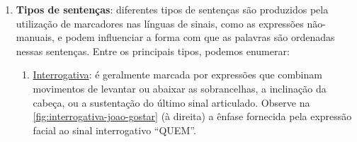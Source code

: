 \begin{enumerate}



    \item \textbf{Tipos de sentenças}: diferentes tipos de sentenças são produzidos pela utilização de marcadores nas línguas de sinais, como as expressões não-manuais, e podem influenciar a forma com que as palavras são ordenadas nessas sentenças.
          Entre os principais tipos, podemos enumerar:



          \begin{enumerate}
              \item \underline{Interrogativa}: é geralmente marcada por expressões que combinam movimentos de levantar ou abaixar as sobrancelhas, a inclinação da cabeça, ou a sustentação do último sinal articulado.
                    Observe na \autoref{fig:interrogativa-joao-gostar} (à direita) a ênfase fornecida pela expressão facial ao sinal interrogativo ``QUEM''.


\end{enumerate}
\end{enumerate}
